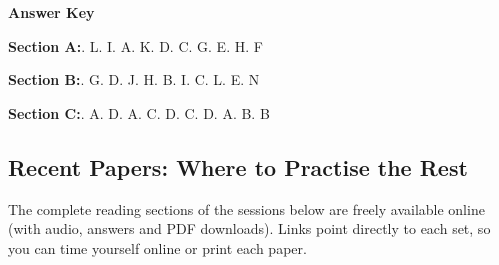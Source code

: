 \smallskip
\bigskip
\noindent\textbf{Answer Key}\par
\smallskip
\noindent\textbf{Section A:}. L. I. A. K. D. C. G. E. H. F\par
\noindent\textbf{Section B:}. G. D. J. H. B. I. C. L. E. N\par
\noindent\textbf{Section C:}. A. D. A. C. D. C. D. A. B. B\par

\subsection{Recent Papers: Where to Practise the Rest}

The complete reading sections of the sessions below are freely available online (with audio, answers and PDF downloads). Links point directly to each set, so you can time yourself online or print each paper.

